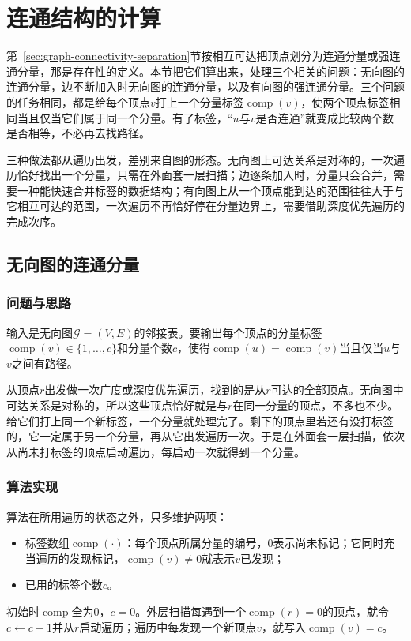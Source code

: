 \section{连通结构的计算}
\label{sec:graph-connectivity-computation}

第~\ref{sec:graph-connectivity-separation}节按相互可达把顶点划分为连通分量或强连通分量，那是存在性的定义。本节把它们算出来，处理三个相关的问题：无向图的连通分量，边不断加入时无向图的连通分量，以及有向图的强连通分量。三个问题的任务相同，都是给每个顶点$v$打上一个分量标签$\operatorname{comp}(v)$，使两个顶点标签相同当且仅当它们属于同一个分量。有了标签，“$u$与$v$是否连通”就变成比较两个数是否相等，不必再去找路径。

三种做法都从遍历出发，差别来自图的形态。无向图上可达关系是对称的，一次遍历恰好找出一个分量，只需在外面套一层扫描；边逐条加入时，分量只会合并，需要一种能快速合并标签的数据结构；有向图上从一个顶点能到达的范围往往大于与它相互可达的范围，一次遍历不再恰好停在分量边界上，需要借助深度优先遍历的完成次序。

\subsection{无向图的连通分量}
\label{sec:graph-trav-components-forest}

\subsubsection{问题与思路}

输入是无向图$\mathcal G=(V,E)$的邻接表。要输出每个顶点的分量标签$\operatorname{comp}(v)\in\{1,\ldots,c\}$和分量个数$c$，使得$\operatorname{comp}(u)=\operatorname{comp}(v)$当且仅当$u$与$v$之间有路径。

从顶点$r$出发做一次广度或深度优先遍历，找到的是从$r$可达的全部顶点。无向图中可达关系是对称的，所以这些顶点恰好就是与$r$在同一分量的顶点，不多也不少。给它们打上同一个新标签，一个分量就处理完了。剩下的顶点里若还有没打标签的，它一定属于另一个分量，再从它出发遍历一次。于是在外面套一层扫描，依次从尚未打标签的顶点启动遍历，每启动一次就得到一个分量。

\subsubsection{算法实现}

算法在所用遍历的状态之外，只多维护两项：
\begin{itemize}
  \item 标签数组$\operatorname{comp}(\cdot)$：每个顶点所属分量的编号，$0$表示尚未标记；它同时充当遍历的发现标记，$\operatorname{comp}(v)\neq0$就表示$v$已发现；
  \item 已用的标签个数$c$。
\end{itemize}
初始时$\operatorname{comp}$全为$0$，$c=0$。外层扫描每遇到一个$\operatorname{comp}(r)=0$的顶点，就令$c\gets c+1$并从$r$启动遍历；遍历中每发现一个新顶点$v$，就写入$\operatorname{comp}(v)=c$。

